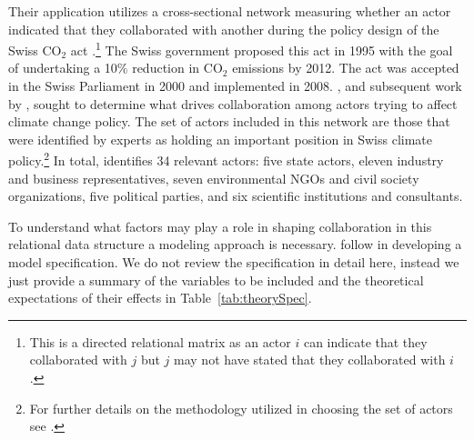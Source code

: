 \documentclass[11pt,pdflatex]{elsarticle}
\begin{document}
Their application utilizes a cross-sectional network measuring whether an actor indicated that they collaborated with another during the policy design of the Swiss CO$_{2}$ act \citep{ingold:2008}.\footnote{This is a directed relational matrix as an actor $i$ can indicate that they collaborated with $j$ but $j$ may not have stated that they collaborated with $i$.} The Swiss government proposed this act in 1995 with the goal of undertaking a 10\% reduction in CO$_{2}$ emissions by 2012. The act was accepted in the Swiss Parliament in 2000 and implemented in 2008. \citet{ingold:2008}, and subsequent work by \citet{ingold:fischer:2014}, sought to determine what drives collaboration among actors trying to affect climate change policy. The set of actors included in this network are those that were identified by experts as holding an important position in Swiss climate policy.\footnote{For further details on the methodology utilized in choosing the set of actors see \citet{ingold:2008,ingold:fischer:2014}.} In total, \citet{ingold:2008} identifies 34 relevant actors: five state actors, eleven industry and business representatives, seven environmental NGOs and civil society organizations, five political parties, and six scientific institutions and consultants. 

To understand what factors may play a role in shaping collaboration in this relational data structure a modeling approach is necessary. \citet{cranmer:etal:2016} follow \citet{ingold:fischer:2014} in developing a model specification. We do not review the specification in detail here, instead we just provide a summary of the variables to be included and the theoretical expectations of their effects in Table~\ref{tab:theorySpec}. 
\end{document}
